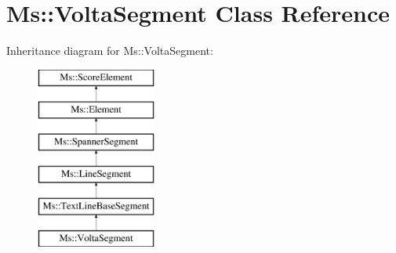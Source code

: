 \hypertarget{class_ms_1_1_volta_segment}{}\section{Ms\+:\+:Volta\+Segment Class Reference}
\label{class_ms_1_1_volta_segment}
Inheritance diagram for Ms\+:\+:Volta\+Segment\+:\begin{figure}[H]
\begin{center}
\leavevmode
\includegraphics[height=6.000000cm]{class_ms_1_1_volta_segment}
\end{center}
\end{figure}
